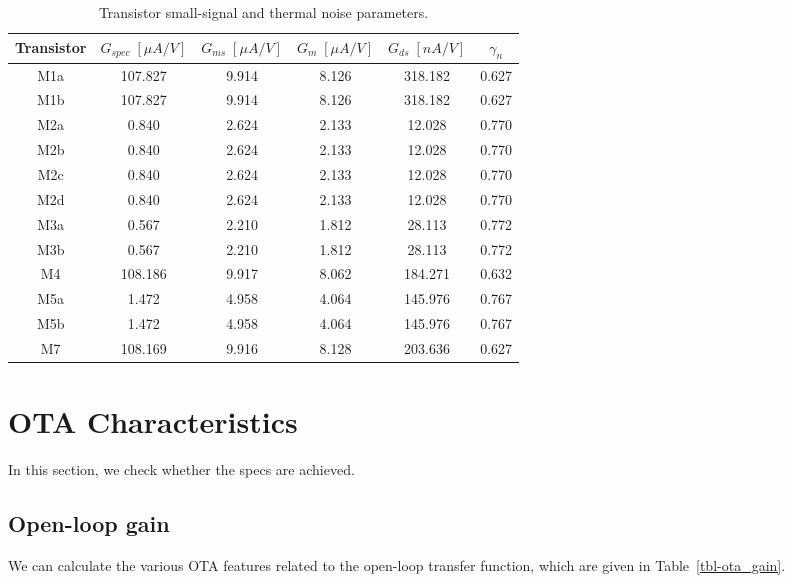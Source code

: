 \documentclass[
  a4paper,
  DIV=11,
  numbers=noendperiod]{scrreprt}
\begin{document}
\begin{longtable}[]{@{}cccccc@{}}

\caption{\label{tbl-transistor_info2}Transistor small-signal and thermal
noise parameters.}

\tabularnewline

\toprule\noalign{}
Transistor & \(G_{{spec}}\;[\mu A/V]\) & \(G_{{ms}}\;[\mu A/V]\) &
\(G_m\;[\mu A/V]\) & \(G_{{ds}}\;[nA/V]\) & \(\gamma_n\) \\
\midrule\noalign{}
\endhead
\bottomrule\noalign{}
\endlastfoot
M1a & 107.827 & 9.914 & 8.126 & 318.182 & 0.627 \\
M1b & 107.827 & 9.914 & 8.126 & 318.182 & 0.627 \\
M2a & 0.840 & 2.624 & 2.133 & 12.028 & 0.770 \\
M2b & 0.840 & 2.624 & 2.133 & 12.028 & 0.770 \\
M2c & 0.840 & 2.624 & 2.133 & 12.028 & 0.770 \\
M2d & 0.840 & 2.624 & 2.133 & 12.028 & 0.770 \\
M3a & 0.567 & 2.210 & 1.812 & 28.113 & 0.772 \\
M3b & 0.567 & 2.210 & 1.812 & 28.113 & 0.772 \\
M4 & 108.186 & 9.917 & 8.062 & 184.271 & 0.632 \\
M5a & 1.472 & 4.958 & 4.064 & 145.976 & 0.767 \\
M5b & 1.472 & 4.958 & 4.064 & 145.976 & 0.767 \\
M7 & 108.169 & 9.916 & 8.128 & 203.636 & 0.627 \\

\end{longtable}

\chapter{OTA Characteristics}\label{ota-characteristics}

In this section, we check whether the specs are achieved.

\section{Open-loop gain}\label{open-loop-gain}

We can calculate the various OTA features related to the open-loop
transfer function, which are given in Table~\ref{tbl-ota_gain}.
\end{document}
